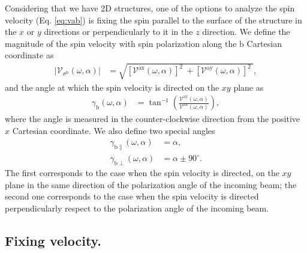 \documentclass[prb,11pt,tightenlines,twocolumn,aps]{revtex4-1}
\begin{document}
{\color{red} Considering that we have 2D structures, one of the options to
analyze the spin velocity (Eq. \eqref{eq:vab}) is fixing the spin parallel to
the surface of the structure in the $x$ or $y$ directions or perpendicularly to
it in the $z$ direction. We define the magnitude of the spin velocity with spin
polarization along the $\mathrm{b}$ Cartesian coordinate as}
\begin{align}
|\mathcal{V}_{\sigma^{\mathrm{b}}}(\omega,\alpha)| 
&=
\sqrt{
[\mathcal{V}^{\mathrm{ax}}(\omega,\alpha)]^{2}\ +
[\mathcal{V}^{\mathrm{ay}}(\omega,\alpha)]^{2}\ 
}, 
\label{eq:vs-mag}
\end{align}
and the angle at which the spin velocity is directed on the $xy$ plane as
\begin{align}
\gamma_{\mathrm{b}} (\omega,\alpha)
&=
\tan^{-1} \left( \frac{\mathcal{V}^{\mathrm{ay}}(\omega,\alpha)}
{\mathcal{V}^{\mathrm{ax}}(\omega,\alpha)} \right),
\label{eq:gamma-ang}
\end{align}
where the angle is measured in the counter-clockwise direction from the positive
$x$ Cartesian coordinate. 
{\color{red}
We also define two special angles
\begin{align}
\gamma_{\mathrm{b \parallel}}(\omega,\alpha) &= \alpha, 
\label{eq:gamma-par} 
\\
\gamma_{\mathrm{b \perp}}(\omega,\alpha) &= \alpha \pm 90^{\circ}.
\label{eq:gamma-perp}
\end{align}
The first corresponds to the case when the spin velocity is directed, on the
$xy$ plane in the same direction of the polarization angle of the incoming beam;
the second one corresponds to the case when the spin velocity is directed
perpendicularly respect to the polarization angle of the incoming beam.
}



\subsection{Fixing velocity.}\label{sec:theory-fixvel}
\end{document}
